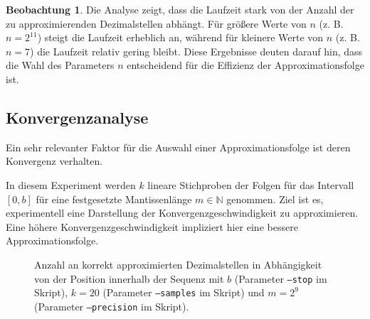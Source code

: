 \documentclass{scrartcl}
\theoremstyle{definition}
\newtheorem{approximation sequence}{Annäherungsfolge}
\newtheorem{observation}{Beobachtung}
\begin{document}
\begin{observation}
    Die Analyse zeigt, dass die Laufzeit stark von der Anzahl der zu approximierenden Dezimalstellen abhängt. Für größere Werte von \(n\) (z. B. \(n = 2^{11}\)) steigt die Laufzeit erheblich an, während für kleinere Werte von \(n\) (z. B. \(n = 7\)) die Laufzeit relativ gering bleibt. Diese Ergebnisse deuten darauf hin, dass die Wahl des Parameters \(n\) entscheidend für die Effizienz der Approximationsfolge ist.
\end{observation}

\subsection{Konvergenzanalyse}

Ein sehr relevanter Faktor für die Auswahl einer Approximationsfolge ist deren
Konvergenz verhalten.

In diesem Experiment werden \(k\) lineare Stichproben der Folgen für das
Intervall \([0, b]\) für eine festgesetzte Mantissenlänge \(m \in \mathbb{N}\)
genommen. Ziel ist es, experimentell eine Darstellung der
Konvergenzgeschwindigkeit zu approximieren. Eine höhere
Konvergenzgeschwindigkeit impliziert hier eine bessere Approximationsfolge.

\begin{figure}[H]
    \centering
    \subfloat[\centering \(b = 10^2\)]{%
        
    }
    \subfloat[\centering \(b = 10^6\)]{%
        
    }
    \caption{%
        Anzahl an korrekt approximierten Dezimalstellen in Abhängigkeit von der
        Position innerhalb der Sequenz mit \(b\) (Parameter \texttt{--stop} im
        Skript), \(k = 20\) (Parameter \texttt{--samples} im Skript) und \(m =
        2^9\) (Parameter \texttt{--precision} im Skript). }
    \label{fig:convergence-analysis}
\end{figure}
\end{document}
